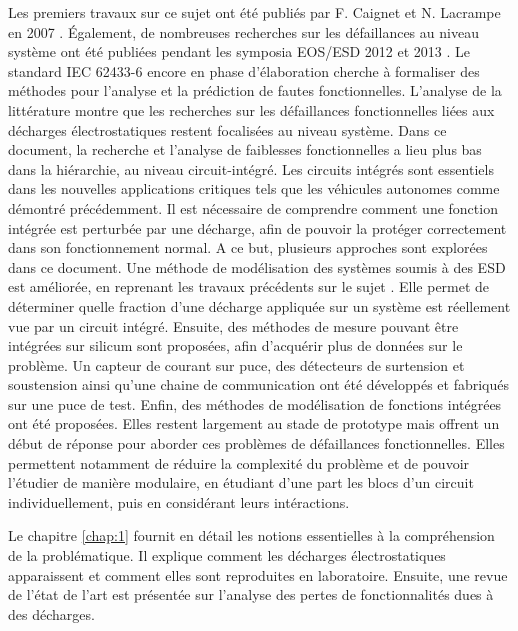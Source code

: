 Les premiers travaux sur ce sujet ont été publiés par F. Caignet et N. Lacrampe en 2007 \cite{LacrampeTransientImmunity}.
Également, de nombreuses recherches sur les défaillances au niveau système ont été publiées pendant les symposia EOS/ESD 2012 \cite{soft-error-esd-1,SDRAMCase,mixedModeESDSims} et 2013 \cite{softFailSubsystem, powered-tlp-soft-fail}.
Le standard IEC 62433-6 \cite{iec62433-6} encore en phase d'élaboration cherche à formaliser des méthodes pour l'analyse et la prédiction de fautes fonctionnelles.
L'analyse de la littérature montre que les recherches sur les défaillances fonctionnelles liées aux décharges électrostatiques restent focalisées au niveau système.
Dans ce document, la recherche et l'analyse de faiblesses fonctionnelles a lieu plus bas dans la hiérarchie, au niveau circuit-intégré.
Les circuits intégrés sont essentiels dans les nouvelles applications critiques tels que les véhicules autonomes comme démontré précédemment.
Il est nécessaire de comprendre comment une fonction intégrée est perturbée par une décharge, afin de pouvoir la protéger correctement dans son fonctionnement normal.
A ce but, plusieurs approches sont explorées dans ce document.
Une méthode de modélisation des systèmes soumis à des ESD est améliorée, en reprenant les travaux précédents sur le sujet \cite{phd-lacrampe, phd-monnereau}.
Elle permet de déterminer quelle fraction d'une décharge appliquée sur un système est réellement vue par un circuit intégré.
Ensuite, des méthodes de mesure pouvant être intégrées sur silicum sont proposées, afin d'acquérir plus de données sur le problème.
Un capteur de courant sur puce, des détecteurs de surtension et soustension ainsi qu'une chaine de communication ont été développés et fabriqués sur une puce de test.
Enfin, des méthodes de modélisation de fonctions intégrées ont été proposées.
Elles restent largement au stade de prototype mais offrent un début de réponse pour aborder ces problèmes de défaillances fonctionnelles.
Elles permettent notamment de réduire la complexité du problème et de pouvoir l'étudier de manière modulaire, en étudiant d'une part les blocs d'un circuit individuellement, puis en considérant leurs intéractions.

%
Le chapitre \ref{chap:1} fournit en détail les notions essentielles à la compréhension de la problématique.
Il explique comment les décharges électrostatiques apparaissent et comment elles sont reproduites en laboratoire.
Ensuite, une revue de l'état de l'art est présentée sur l'analyse des pertes de fonctionnalités dues à des décharges.


